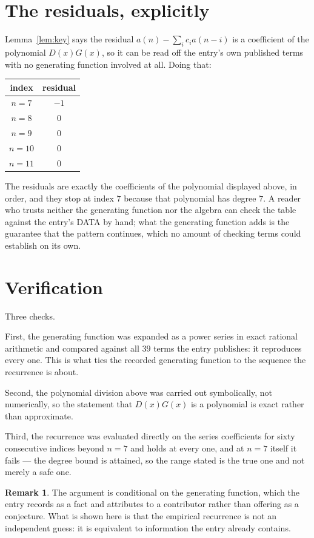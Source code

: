 \documentclass[11pt,a4paper]{article}
\theoremstyle{plain}
\theoremstyle{definition}
\newtheorem{remark}[theorem]{Remark}
\begin{document}
\section{The residuals, explicitly}

Lemma~\ref{lem:key} says the residual $a(n)-\sum_ic_ia(n-i)$ is a coefficient of the
polynomial $D(x)G(x)$, so it can be read off the entry's own published terms with no
generating function involved at all. Doing that:
\begin{center}
\begin{tabular}{cc}
index & residual \\ \hline
$n=7$ & $-1$ \\
$n=8$ & $0$ \\
$n=9$ & $0$ \\
$n=10$ & $0$ \\
$n=11$ & $0$
\end{tabular}
\end{center}
The residuals are exactly the coefficients of the polynomial displayed above, in order, and
they stop at index $7$ because that polynomial has degree $7$. A reader who trusts
neither the generating function nor the algebra can check the table against the entry's DATA
by hand; what the generating function adds is the guarantee that the pattern continues, which
no amount of checking terms could establish on its own.

\section{Verification}

Three checks.

First, the generating function was expanded as a power series in exact rational arithmetic and
compared against all $39$ terms the entry publishes: it reproduces every one. This is
what ties the recorded generating function to the sequence the recurrence is about.

Second, the polynomial division above was carried out symbolically, not numerically, so the
statement that $D(x)G(x)$ is a polynomial is exact rather than approximate.

Third, the recurrence was evaluated directly on the series coefficients for sixty consecutive
indices beyond $n=7$ and holds at every one, and at $n=7$ itself it fails --- the
degree bound is attained, so the range stated is the true one and not merely a safe one.

\begin{remark}
The argument is conditional on the generating function, which the entry records as a fact and
attributes to a contributor rather than offering as a conjecture. What is shown here is that
the empirical recurrence is not an independent guess: it is equivalent to information the
entry already contains.
\end{remark}
\end{document}
